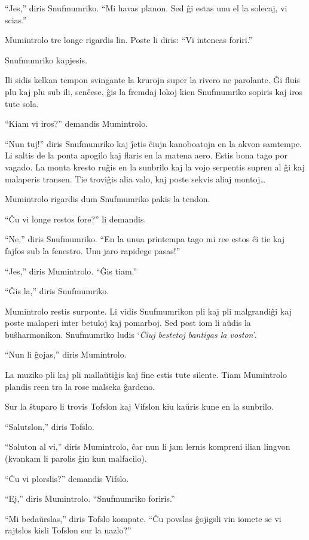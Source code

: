 ``Jes,'' diris Snufmumriko. ``Mi havas planon. Sed ĝi estas unu el la solecaj, vi scias.''

Mumintrolo tre longe rigardis lin. Poste li diris: ``Vi intencas foriri.''

Snufmumriko kapjesis.

Ili sidis kelkan tempon svingante la krurojn super la rivero ne parolante. Ĝi fluis plu kaj plu sub ili, senĉese, ĝis la fremdaj lokoj kien Snufmumriko sopiris kaj iros tute sola.

``Kiam vi iros?'' demandis Mumintrolo.

``Nun tuj!'' diris Snufmumriko kaj ĵetis ĉiujn kanoboatojn en la akvon samtempe. Li saltis de la ponta apogilo kaj flaris en la matena aero. Estis bona tago por vagado. La monta kresto ruĝis en la sunbrilo kaj la vojo serpentis supren al ĝi kaj malaperis transen. Tie troviĝis alia valo, kaj poste sekvis aliaj montoj{\ldots}

Mumintrolo rigardis dum Snufmumriko pakis la tendon.

``Ĉu vi longe restos fore?'' li demandis.

``Ne,'' diris Snufmumriko. ``En la unua printempa tago mi ree estos ĉi tie kaj fajfos sub la fenestro. Unu jaro rapidege pasas!''

``Jes,'' diris Mumintrolo. ``Ĝis tiam.''

``Ĝis la,'' diris Snufmumriko.

Mumintrolo restis surponte. Li vidis Snufmumrikon pli kaj pli malgrandiĝi kaj poste malaperi inter betuloj kaj pomarboj. Sed post iom li aŭdis la buŝharmonikon. Snufmumriko ludis `\emph{Ĉiuj bestetoj bantigas la voston}'.

``Nun li ĝojas,'' diris Mumintrolo.

La muziko pli kaj pli mallaŭtiĝis kaj fine estis tute silente. Tiam Mumintrolo plandis reen tra la rose malseka ĝardeno.

Sur la ŝtuparo li trovis Tofslon kaj Vifslon kiu kaŭris kune en la sunbrilo.

``Salutslon,'' diris Tofslo.

``Saluton al vi,'' diris Mumintrolo, ĉar nun li jam lernis kompreni ilian lingvon (kvankam li parolis ĝin kun malfacilo).

``Ĉu vi plorslis?'' demandis Vifslo.

``Ej,'' diris Mumintrolo. ``Snufmumriko foriris.''

``Mi bedaŭrslas,'' diris Tofslo kompate. ``Ĉu povslas ĝojigsli vin iomete se vi rajtslos kisli Tofslon sur la nazlo?''

